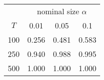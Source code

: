 % 
\begin{tabular}{cccc}
  \hline
  & \multicolumn{3}{c}{nominal size $\alpha$} \\
 $T$ & 0.01 & 0.05 & 0.1 \\
 \hline
100 & 0.256 & 0.481 & 0.583 \\ 
  250 & 0.940 & 0.988 & 0.995 \\ 
  500 & 1.000 & 1.000 & 1.000 \\ 
   \hline
\end{tabular}
